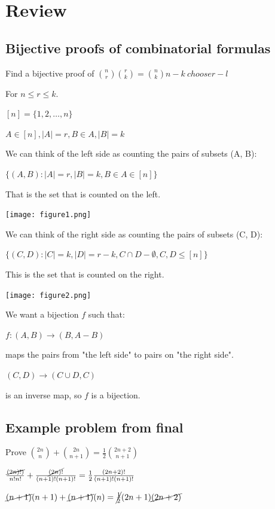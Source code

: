 \documentclass[9pt, letterpaper, oneside]{article}
\begin{document}

\section{Review}

\subsection{Bijective proofs of combinatorial formulas}

Find a bijective proof of ${n \choose r}{r \choose k} = {n \choose k}{n - k \ choose r -l}$

For $n \leq r \leq k$.

$[n] = \{1, 2, \ldots , n\}$

$A \in [n], |A| = r, B \in A, |B| = k$

We can think of the left side as counting the pairs of subsets (A, B):

$\{(A, B): |A| = r, |B| = k, B \in A \in [n]\}$

That is the set that is counted on the left.

\texttt{[image: figure1.png]}

We can think of the right side as counting the pairs of subsets (C, D):

$\{(C, D): |C| = k, |D| = r - k, C \cap D - \emptyset, C, D \leq [n]\}$

This is the set that is counted on the right.

\texttt{[image: figure2.png]}

We want a bijection $f$ such that:

$f: (A, B) \to (B, A - B)$ 

maps the pairs from "the left side" to pairs on "the right side".

$(C, D) \to (C \cup D, C)$ 

is an inverse map, so $f$ is a bijection.

\subsection{Example problem from final}

Prove ${2n \choose n} + {2n \choose n + 1} = \frac{1}{2}{2n + 2 \choose n + 1}$

$\frac{\cancel{(2n)!)}}{n!n!} + \frac{\cancel{(2n)!}}{(n+1)!(n+1)!} = \frac{1}{2} \frac{(2n+2)!}{(n+1)!(n+1)!}$

$\cancel{(n+1)}(n+1) + \cancel{(n+1)}(n) = \cancel{\frac{1}{2}}(2n + 1)\cancel{(2n + 2)}$
\end{document}
